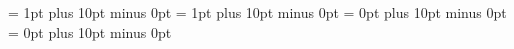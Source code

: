 \documentclass[11pt]{article}
\begin{document}
    \small
    \abovedisplayskip = 1pt plus 10pt minus 0pt
    \belowdisplayskip = 1pt plus 10pt minus 0pt
    \abovedisplayshortskip = 0pt plus 10pt minus 0pt
    \belowdisplayshortskip = 0pt plus 10pt minus 0pt

    \begin{multicols*}{2}%
    \end{multicols*}
\end{document}
